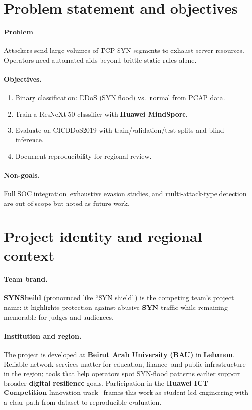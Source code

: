 \documentclass[11pt,a4paper]{article}
\newcommand{\TeamName}{SYNSheild}
\begin{document}
\section{Problem statement and objectives}

\paragraph{Problem.}
Attackers send large volumes of TCP SYN segments to exhaust server resources. Operators need automated aids beyond brittle static rules alone.

\paragraph{Objectives.}
\begin{enumerate}[leftmargin=*]
  \item Binary classification: DDoS (SYN flood) vs.\ normal from PCAP data.
  \item Train a ResNeXt-50 classifier with \textbf{Huawei MindSpore}.
  \item Evaluate on CICDDoS2019 with train/validation/test splits and blind inference.
  \item Document reproducibility for regional review.
\end{enumerate}

\paragraph{Non-goals.}
Full SOC integration, exhaustive evasion studies, and multi-attack-type detection are out of scope but noted as future work.

\section{Project identity and regional context}

\paragraph{Team brand.}
\textbf{\TeamName} (pronounced like ``SYN shield'') is the competing team's project name: it highlights protection against abusive \textbf{SYN} traffic while remaining memorable for judges and audiences.

\paragraph{Institution and region.}
The project is developed at \textbf{Beirut Arab University (BAU)} in \textbf{Lebanon}. Reliable network services matter for education, finance, and public infrastructure in the region; tools that help operators spot SYN-flood patterns earlier support broader \textbf{digital resilience} goals. Participation in the \textbf{Huawei ICT Competition} Innovation track~\cite{ictcompetition} frames this work as student-led engineering with a clear path from dataset to reproducible evaluation.
\end{document}

